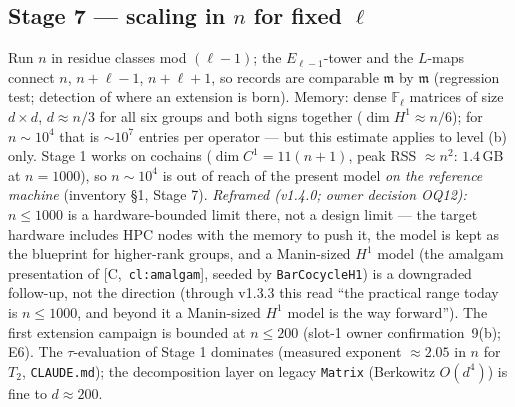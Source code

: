 \documentclass[11pt]{article}
\theoremstyle{remark}
\newcommand{\F}{\mathbb{F}}
\newcommand{\Fl}{\F_\ell}
\newcommand{\m}{\mathfrak{m}}
\newcommand{\HA}[1]{[C,~\texttt{#1}]}      %
\begin{document}
\subsection*{Stage 7 --- scaling in $n$ for fixed $\ell$}
Run $n$ in residue classes mod $(\ell-1)$; the $E_{\ell-1}$-tower and the $L$-maps connect
$n$, $n+\ell-1$, $n+\ell+1$, so records are comparable $\m$ by $\m$ (regression test; detection of
where an extension is born). Memory: dense $\Fl$ matrices of size $d\times d$, $d\approx n/3$
for all six groups and both signs together ($\dim H^1\approx n/6$); for $n\sim10^4$ that is $\sim10^7$ entries per operator --- but this estimate applies
to level (b) only. Stage 1 works on cochains ($\dim C^1=11(n+1)$, peak RSS $\approx n^2$: $1.4$\,GB
at $n=1000$), so $n\sim10^4$ is out of reach of the present model \emph{on the reference
machine} (inventory \S1, Stage 7). \emph{Reframed (v1.4.0; owner decision OQ12):} $n\le1000$ is
a hardware-bounded limit there, not a design limit --- the target hardware includes HPC nodes
with the memory to push it, the model is kept as the blueprint for higher-rank groups, and a
Manin-sized $H^1$ model (the amalgam presentation of \HA{cl:amalgam}, seeded by
\texttt{BarCocycleH1}) is a downgraded follow-up, not the direction (through v1.3.3 this read
``the practical range today is $n\le1000$, and beyond it a Manin-sized $H^1$ model is the way
forward''). The first extension campaign is bounded at $n\le200$ (slot-1 owner
confirmation~9(b); E6). The
$\tau$-evaluation of Stage 1 dominates (measured exponent $\approx2.05$ in $n$ for $T_2$,
\texttt{CLAUDE.md}); the decomposition layer on legacy \texttt{Matrix} (Berkowitz $O(d^4)$) is fine
to $d\approx200$.
\end{document}
